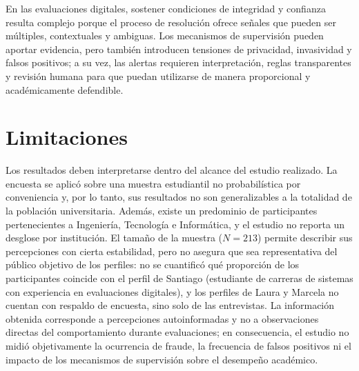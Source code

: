 En las evaluaciones digitales, sostener condiciones de integridad y confianza resulta complejo porque el proceso de resolución ofrece señales que pueden ser múltiples, contextuales y ambiguas. Los mecanismos de supervisión pueden aportar evidencia, pero también introducen tensiones de privacidad, invasividad y falsos positivos; a su vez, las alertas requieren interpretación, reglas transparentes y revisión humana para que puedan utilizarse de manera proporcional y académicamente defendible.

\section{Limitaciones}
\label{sec:ur_limitaciones}

Los resultados deben interpretarse dentro del alcance del estudio realizado. La encuesta se aplicó sobre una muestra estudiantil no probabilística por conveniencia y, por lo tanto, sus resultados no son generalizables a la totalidad de la población universitaria. Además, existe un predominio de participantes pertenecientes a Ingeniería, Tecnología e Informática, y el estudio no reporta un desglose por institución. El tamaño de la muestra ($N=213$) permite describir sus percepciones con cierta estabilidad, pero no asegura que sea representativa del público objetivo de los perfiles: no se cuantificó qué proporción de los participantes coincide con el perfil de Santiago (estudiante de carreras de sistemas con experiencia en evaluaciones digitales), y los perfiles de Laura y Marcela no cuentan con respaldo de encuesta, sino solo de las entrevistas. La información obtenida corresponde a percepciones autoinformadas y no a observaciones directas del comportamiento durante evaluaciones; en consecuencia, el estudio no midió objetivamente la ocurrencia de fraude, la frecuencia de falsos positivos ni el impacto de los mecanismos de supervisión sobre el desempeño académico.

